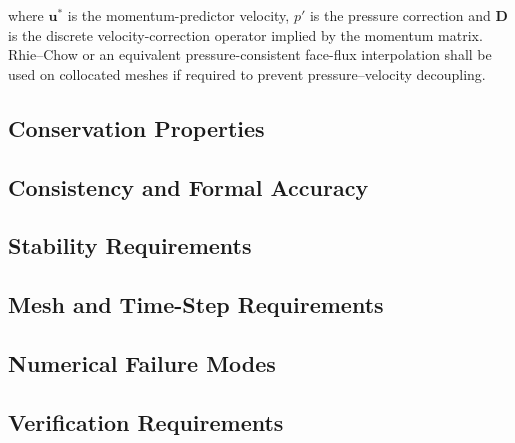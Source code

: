 where $\mathbf{u}^{*}$ is the momentum-predictor velocity,
$p'$ is the pressure correction and $\mathbf{D}$ is the discrete
velocity-correction operator implied by the momentum matrix. Rhie--Chow
or an equivalent pressure-consistent face-flux interpolation shall be
used on collocated meshes if required to prevent pressure--velocity
decoupling.

\subsection{Conservation Properties}
\label{sec:res-num-frm-conservation-properties}


\subsection{Consistency and Formal Accuracy}
\label{sec:res-num-frm-consistency-formal-accuracy}


\subsection{Stability Requirements}
\label{sec:res-num-frm-stability-requirements}


\subsection{Mesh and Time-Step Requirements}
\label{sec:res-num-frm-mesh-time-step-requirements}


\subsection{Numerical Failure Modes}
\label{sec:res-num-frm-numerical-failure-modes}


\subsection{Verification Requirements}
\label{sec:res-num-frm-verification-requirements}

